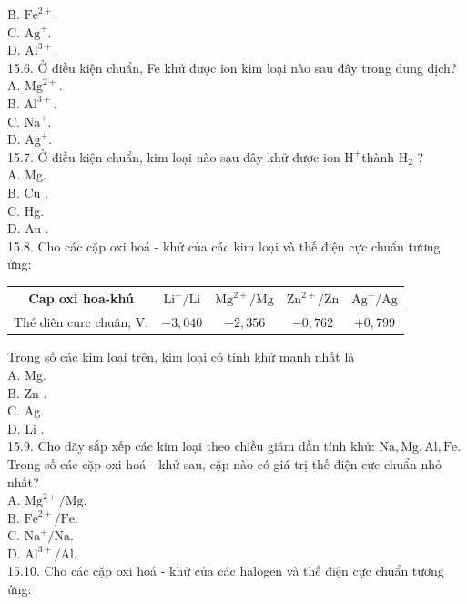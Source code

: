 \documentclass[10pt]{article}
\begin{document}
B. $\mathrm{Fe}^{2+}$.\\
C. $\mathrm{Ag}^{+}$.\\
D. $\mathrm{Al}^{3+}$.\\
15.6. Ở điều kiện chuẩn, Fe khử được ion kim loại nào sau đây trong dung dịch?\\
A. $\mathrm{Mg}^{2+}$.\\
B. $\mathrm{Al}^{3+}$.\\
C. $\mathrm{Na}^{+}$.\\
D. $\mathrm{Ag}^{+}$.\\
15.7. Ở điều kiện chuẩn, kim loại nào sau đây khử được ion $\mathrm{H}^{+}$thành $\mathrm{H}_{2}$ ?\\
A. Mg.\\
B. Cu .\\
C. Hg.\\
D. Au .\\
15.8. Cho các cặp oxi hoá - khử của các kim loại và thế điện cực chuẩn tương ứng:

\begin{center}
\begin{tabular}{|c|c|c|c|c|}
\hline
Cap oxi hoa-khú & $\mathrm{Li}^{+} / \mathrm{Li}$ & $\mathrm{Mg}^{2+} / \mathrm{Mg}$ & $\mathrm{Zn}^{2+} / \mathrm{Zn}$ & $\mathrm{Ag}^{+} / \mathrm{Ag}$ \\
\hline
Thé diên curc chuân, V. & $-3,040$ & $-2,356$ & $-0,762$ & $+0,799$ \\
\hline
\end{tabular}
\end{center}

Trong số các kim loại trên, kim loại có tính khử mạnh nhất là\\
A. Mg.\\
B. Zn .\\
C. Ag.\\
D. Li .\\
15.9. Cho dãy sắp xếp các kim loại theo chiều giảm dần tính khử: $\mathrm{Na}, \mathrm{Mg}, \mathrm{Al}, \mathrm{Fe}$. Trong số các cặp oxi hoá - khử sau, cặp nào có giá trị thế điện cực chuẩn nhỏ nhất?\\
A. $\mathrm{Mg}^{2+} / \mathrm{Mg}$.\\
B. $\mathrm{Fe}^{2+} / \mathrm{Fe}$.\\
C. $\mathrm{Na}^{+} / \mathrm{Na}$.\\
D. $\mathrm{Al}^{3+} / \mathrm{Al}$.\\
15.10. Cho các cặp oxi hoá - khử của các halogen và thế điện cực chuẩn tương ứng:
\end{document}
